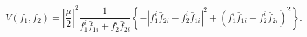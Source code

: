 \begin{equation}
 V(f_1,f_2) = \left|\frac{\mu}{2}\right|^2
               \frac{1}{f_1^i {\bar{f}}_{1i} + f_2^i {\bar{f}}_{2i}}
               \left\{-
|f_1^i {\bar{f}}_{2i} - f_2^i {\bar{f}}_{1i}|^2
           +(f_1^i {\bar{f}}_{1i} + f_2^i {\bar{f}}_{2i})^2 \right\}. 
               \label{pothss}
\end{equation} 
